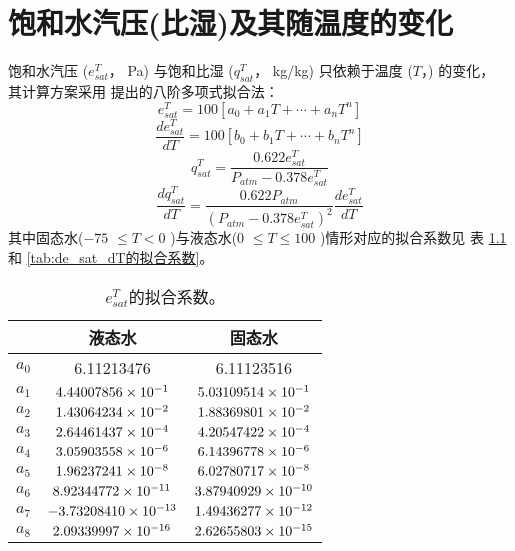  \chapter{饱和水汽压(比湿)及其随温度的变化}\label{饱和水汽压(比湿)及其随温度的变化}
饱和水汽压 ($e_{sat}^T$， Pa) 与饱和比湿 ($q_{sat}^T$， kg/kg) 只依赖于温度 ($T$，\textcelsius) 的变化，
其计算方案采用\citet{flatau1992polynomial} 提出的八阶多项式拟合法：
\begin{equation}
e_{s a t}^{T}=100\left[a_{0}+a_{1} T+\cdots+a_{n} T^{n}\right]
\end{equation}
\begin{equation}
\frac{d e_{s a t}^{T}}{d T}=100\left[b_{0}+b_{1} T+\cdots+b_{n} T^{n}\right]
\end{equation}
\begin{equation}
q_{s a t}^{T}=\frac{0.622 e_{s a t}^{T}}{P_{atm}-0.378 e_{s a t}^{T}}
\end{equation}
\begin{equation}
\frac{d q_{{sat }}^{T}}{d T}=\frac{0.622 P_{atm}}{\left(P_{atm}-0.378 e_{{sat }}^{T}\right)^{2}} \frac{d e_{{sat }}^{T}}{d T}
\end{equation}
其中固态水($-75$ \textcelsius $\le T < 0$ \textcelsius)与液态水($0$ \textcelsius $\le T\le100$ \textcelsius)情形对应的拟合系数见
表 \ref{tab:e_sat_T的拟合系数} 和 \ref{tab:de_sat_dT的拟合系数}。
\begin{table}[]
\centering
\caption{$e_{sat}^T$的拟合系数。}
\label{tab:e_sat_T的拟合系数}
\begin{tabular}{@{}lcc@{}}
\toprule
     &  液态水  & 固态水                         \\ \midrule
$a_0$ & 6.11213476        & 6.11123516       \\
$a_1$ & $\rm 4.44007856 \times 10^{-1}$   & $\rm 5.03109514 \times 10^{-1}$  \\
$a_2$ & $\rm 1.43064234 \times 10^{-2}$   & $\rm 1.88369801 \times 10^{-2}$  \\
$a_3$ & $\rm 2.64461437 \times 10^{-4}$   & $\rm 4.20547422 \times 10^{-4}$  \\
$a_4$ & $\rm 3.05903558 \times 10^{-6}$   & $\rm 6.14396778 \times 10^{-6}$  \\
$a_5$ & $\rm 1.96237241 \times 10^{-8}$   & $\rm 6.02780717 \times 10^{-8}$  \\
$a_6$ & $\rm 8.92344772 \times 10^{-11}$  & $\rm 3.87940929 \times 10^{-10}$ \\
$a_7$ & $\rm -3.73208410 \times 10^{-13}$ & $\rm 1.49436277 \times 10^{-12}$ \\
$a_8$ & $\rm 2.09339997 \times 10^{-16}$  & $\rm 2.62655803 \times 10^{-15}$ \\ \bottomrule
\end{tabular}
\end{table}

